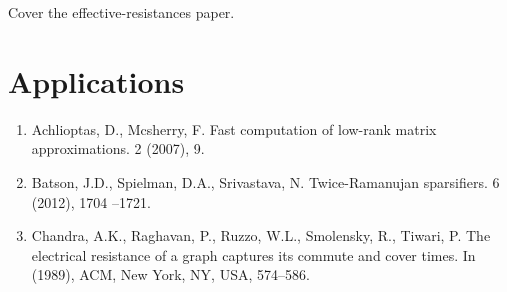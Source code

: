 \documentclass{article}
\begin{document}
Cover the effective-resistances paper.

\section{Applications}




\begin{enumerate}[1.]
    \item Achlioptas, D., Mcsherry, F. Fast computation of low-rank matrix
        approximations. 2 (2007), 9.

    \item Batson, J.D., Spielman, D.A., Srivastava, N.  Twice-Ramanujan
        sparsifiers. 6 (2012), 1704 –1721.

    \item Chandra, A.K., Raghavan, P., Ruzzo, W.L., Smolensky, R., Tiwari,
        P.  The electrical resistance of a graph captures its commute and
        cover times. In (1989), ACM, New York, NY, USA, 574–586.
\end{enumerate}
\end{document}
